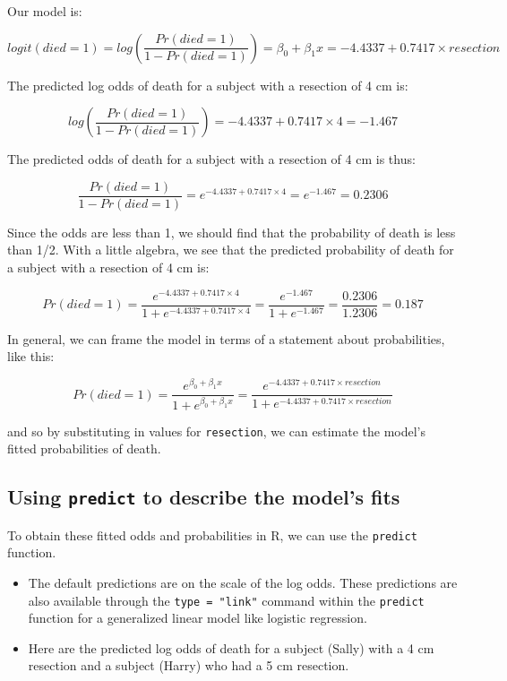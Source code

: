 \documentclass[]{book}
\providecommand{\tightlist}{%
  \setlength{\itemsep}{0pt}\setlength{\parskip}{0pt}}
\theoremstyle{definition}
\theoremstyle{definition}
\theoremstyle{definition}
\theoremstyle{remark}
\begin{document}
Our model is:

\[
logit(died = 1) = log\left(\frac{Pr(died = 1)}{1 - Pr(died = 1)}\right) = \beta_0 + \beta_1 x = -4.4337 + 0.7417 \times resection
\]

The predicted log odds of death for a subject with a resection of 4 cm
is:

\[
log\left(\frac{Pr(died = 1)}{1 - Pr(died = 1)}\right) = -4.4337 + 0.7417 \times 4 = -1.467
\]

The predicted odds of death for a subject with a resection of 4 cm is
thus:

\[
\frac{Pr(died = 1)}{1 - Pr(died = 1)} = e^{-4.4337 + 0.7417 \times 4} = e^{-1.467} = 0.2306
\]

Since the odds are less than 1, we should find that the probability of
death is less than 1/2. With a little algebra, we see that the predicted
probability of death for a subject with a resection of 4 cm is:

\[
Pr(died = 1) = \frac{e^{-4.4337 + 0.7417 \times 4}}{1 + e^{-4.4337 + 0.7417 \times 4}} = \frac{e^{-1.467}}{1 + e^{-1.467}} = \frac{0.2306}{1.2306} = 0.187
\]

In general, we can frame the model in terms of a statement about
probabilities, like this:

\[
Pr(died = 1) = \frac{e^{\beta_0 + \beta_1 x}}{1 + {e^{\beta_0 + \beta_1 x}}} = \frac{e^{-4.4337 + 0.7417 \times resection}}{1 + e^{-4.4337 + 0.7417 \times resection}}
\]

and so by substituting in values for \texttt{resection}, we can estimate
the model's fitted probabilities of death.

\subsection{\texorpdfstring{Using \texttt{predict} to describe the
model's
fits}{Using predict to describe the model's fits}}\label{using-predict-to-describe-the-models-fits}

To obtain these fitted odds and probabilities in R, we can use the
\texttt{predict} function.

\begin{itemize}
\tightlist
\item
  The default predictions are on the scale of the log odds. These
  predictions are also available through the \texttt{type\ =\ "link"}
  command within the \texttt{predict} function for a generalized linear
  model like logistic regression.
\item
  Here are the predicted log odds of death for a subject (Sally) with a
  4 cm resection and a subject (Harry) who had a 5 cm resection.
\end{itemize}
\end{document}
